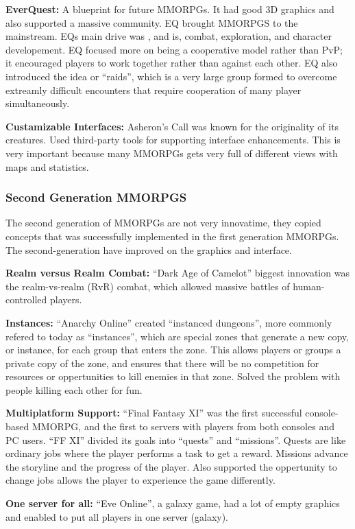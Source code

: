     {\bf EverQuest:} A blueprint for future MMORPGs. It had good 3D graphics and also supported a massive community. EQ brought MMORPGS to the mainstream. EQs main drive was , and is, combat, exploration, and character developement. EQ focused more on being a cooperative model rather than PvP; it encouraged players to work together rather than against each other. EQ also introduced the idea or ``raids'', which is a very large group formed to overcome extreamly difficult encounters that require cooperation of many player simultaneously. 

    {\bf Custamizable Interfaces:} Asheron's Call was known for the originality of its creatures. Used third-party tools for supporting interface enhancements. This is very important because many MMORPGs gets very full of different views with maps and statistics. 

    \subsubsection*{Second Generation MMORPGS}
    The second generation of MMORPGs are not very innovatime, they copied concepts that was successfully implemented in the first generation MMORPGs. The second-generation have improved on the graphics and interface. 

    {\bf Realm versus Realm Combat:} ``Dark Age of Camelot'' biggest innovation was the realm-vs-realm (RvR) combat, which allowed massive battles of human-controlled players. 

    {\bf Instances:} ``Anarchy Online'' created ``instanced dungeons'', more commonly refered to today as ``instances'', which are special zones that generate a new copy, or instance, for each group that enters the zone. This allows players or groups a private copy of the zone, and ensures that there will be no competition for resources or oppertunities to kill enemies in that zone. Solved the problem with people killing each other for fun. 

    {\bf Multiplatform Support:} ``Final Fantasy XI'' was the first successful console-based MMORPG, and the first to servers with players from both consoles and PC users. ``FF XI'' divided its goals into ``quests'' and ``missions''. Quests are like ordinary jobs where the player performs a task to get a reward. Missions advance the storyline and the progress of the player. Also supported the oppertunity to change jobs allows the player to experience the game differently. 

    {\bf One server for all:} ``Eve Online'', a galaxy game, had a lot of empty graphics and enabled to put all players in one server (galaxy).  

